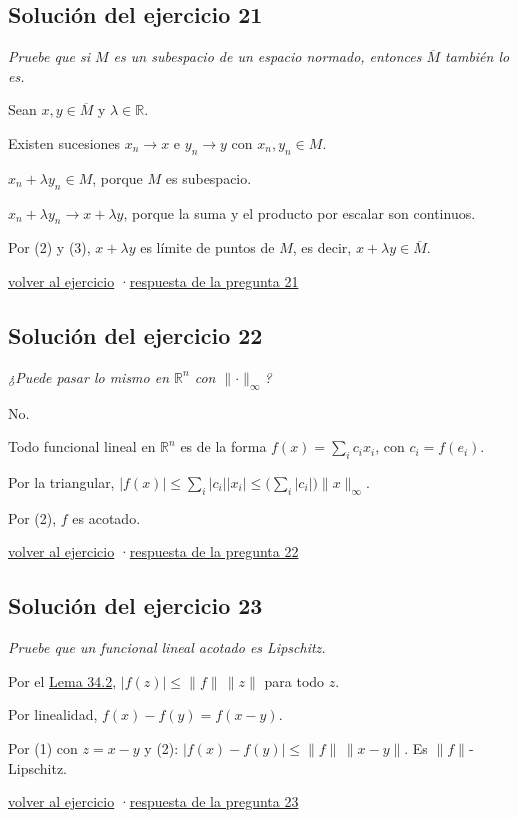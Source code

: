 \documentclass[11pt,a4paper]{article}
\newcommand{\R}{\mathbb{R}}\newcommand{\N}{\mathbb{N}}\newcommand{\Q}{\mathbb{Q}}
\newcommand{\cl}[1]{\overline{#1}}\newcommand{\norm}[1]{\lVert #1\rVert}\newcommand{\abs}[1]{\lvert #1\rvert}
\begin{document}
\subsection*{\hypertarget{s-21}{}Solución del ejercicio 21}
\emph{Pruebe que si $M$ es un subespacio de un espacio normado, entonces $\cl M$ también lo es.}
\begin{pasos}
\item[] Sean $x,y\in\cl M$ y $\lambda\in\R$.
\item[(1)] Existen sucesiones $x_n\to x$ e $y_n\to y$ con $x_n,y_n\in M$.
\item[(2)] $x_n+\lambda y_n\in M$, porque $M$ es subespacio.
\item[(3)] $x_n+\lambda y_n\to x+\lambda y$, porque la suma y el producto por escalar son continuos.
\item[] Por (2) y (3), $x+\lambda y$ es límite de puntos de $M$, es decir, $x+\lambda y\in\cl M$.
\end{pasos}
\par{\small \hyperlink{x-21}{volver al ejercicio} \quad·\quad \hyperlink{r-21}{respuesta de la pregunta 21}}
\subsection*{\hypertarget{s-22}{}Solución del ejercicio 22}
\emph{¿Puede pasar lo mismo en $\R^n$ con $\norm\cdot_\infty$?}
\begin{pasos}
\item[] No.
\item[(1)] Todo funcional lineal en $\R^n$ es de la forma $f(x)=\sum_ic_ix_i$, con $c_i=f(e_i)$.
\item[(2)] Por la triangular, $\abs{f(x)}\le\sum_i\abs{c_i}\abs{x_i}\le\bigl(\sum_i\abs{c_i}\bigr)\norm x_\infty$.
\item[] Por (2), $f$ es acotado.
\end{pasos}
\par{\small \hyperlink{x-22}{volver al ejercicio} \quad·\quad \hyperlink{r-22}{respuesta de la pregunta 22}}
\subsection*{\hypertarget{s-23}{}Solución del ejercicio 23}
\emph{Pruebe que un funcional lineal acotado es Lipschitz.}
\begin{pasos}
\item[(1)] Por el \href{https://decostruttivismo.github.io/MAT2514-repaso/pdf/MAT2514_apuntes_completos.pdf\#nameddest=teorema.34.2}{Lema 34.2}, $\abs{f(z)}\le\norm f\,\norm z$ para todo $z$.
\item[(2)] Por linealidad, $f(x)-f(y)=f(x-y)$.
\item[] Por (1) con $z=x-y$ y (2): $\abs{f(x)-f(y)}\le\norm f\,\norm{x-y}$. Es $\norm f$-Lipschitz.
\end{pasos}
\par{\small \hyperlink{x-23}{volver al ejercicio} \quad·\quad \hyperlink{r-23}{respuesta de la pregunta 23}}
\end{document}
